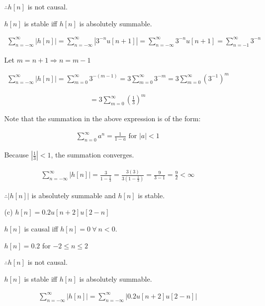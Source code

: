 \documentclass[fleqn]{article}
\begin{document}
\begin{enumerate}[nolistsep]
\begin{enumerate}[nolistsep]
					$\therefore h[n]$ is not causal.
					
					$h[n]$ is stable iff $h[n]$ is absolutely summable.
					
					\begin{align*}
						\sum_{n=-\infty}^{\infty}{|h[n]|} = \sum_{n=-\infty}^{\infty}{|3^{-n}u[n+1]|} = \sum_{n=-\infty}^{\infty}{3^{-n}u[n+1]} = \sum_{n=-1}^{\infty}{3^{-n}}
					\end{align*}
					
					Let $m = n + 1 \Rightarrow n = m - 1$
					
					\begin{align*}
						\sum_{n=-\infty}^{\infty}{|h[n]|} = \sum_{m=0}^{\infty}{3^{-(m-1)}} = 3\sum_{m=0}^{\infty}{3^{-m}} = 3\sum_{m=0}^{\infty}{(3^{-1})^{m}}
					\end{align*}
					
					\begin{align*}
						 = 3\sum_{m=0}^{\infty}{\left(\frac{1}{3}\right)^{m}}
					\end{align*}
					
					Note that the summation in the above expression is of the form:
					
					\begin{align*}
						\sum_{n=0}^{\infty}{a^n} = \frac{1}{1-a} \text{ for } |a| < 1 
					\end{align*}
					
					Because $|\frac{1}{3}| < 1$, the summation converges.
					
					\begin{align*}
						\sum_{n=-\infty}^{\infty}{|h[n]|} = \frac{3}{1-\frac{1}{3}} = \frac{3(3)}{3\left(1-\frac{1}{3}\right)} = \frac{9}{3 - 1} = \frac{9}{2} < \infty
					\end{align*}
					
					$\therefore |h[n]|$ is absolutely summable and $h[n]$ is stable.
					
				\item[(c)] $h[n] = 0.2u[n+2]u[2-n]$
				
					$h[n]$ is causal iff $h[n] = 0\ \forall\ n < 0$.
					
					$h[n] = 0.2$ for $-2 \leq n \leq 2$
					
					$\therefore h[n]$ is not causal.
					
					$h[n]$ is stable iff $h[n]$ is absolutely summable.
					
					\begin{align*}
						\sum_{n=-\infty}^{\infty}{|h[n]|} = \sum_{n=-\infty}^{\infty}{|0.2u[n+2]u[2-n]|}
					\end{align*}
					

\end{enumerate}
\end{enumerate}
\end{document}
